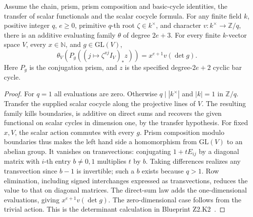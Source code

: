 
\begin{theorem}\label{pn:P033}
Assume the chain, prism, prism composition and basic-cycle identities,
the transfer of scalar functionals and the scalar cocycle formula.
For any finite field \(k\), positive integer \(q\), \(e\ge0\),
primitive \(q\)-th root \(\zeta\in k^\times\), and character
\(v:k^\times\to\mathbb Z/q\), there is an additive evaluating
family \(\theta\) of degree \(2e+3\). For every finite \(k\)-vector
space \(V\), every \(x\in\mathbb N\), and \(g\in\mathrm{GL}(V)\),
\[
 \theta_V\!\left(P_g((j\mapsto\zeta^{xj}I_V)_*z)\right)
 = x^{e+1}v(\det g).
\]
Here \(P_g\) is the conjugation prism, and \(z\) is the specified
degree-\(2e+2\) cyclic bar cycle.
\end{theorem}
\begin{proof}
For \(q=1\) all evaluations are zero. Otherwise \(q\mid |k^\times|\)
and \(|k|=1\) in \(\mathbb Z/q\). Transfer the supplied scalar
cocycle along the projective lines of \(V\). The resulting family
kills boundaries, is additive on direct sums and recovers the given
functional on scalar cycles in dimension one, by the transfer hypothesis.
For fixed \(x,V\), the scalar action commutes with every \(g\).
Prism composition modulo boundaries thus makes the left hand side
a homomorphism from \(\mathrm{GL}(V)\) to an abelian group. It
vanishes on transvections: conjugating \(1+tE_{ij}\) by a diagonal
matrix with \(i\)-th entry \(b\ne0,1\) multiplies \(t\) by \(b\).
Taking differences realizes any transvection since \(b-1\) is
invertible; such a \(b\) exists because \(q>1\). Row elimination,
including signed interchanges expressed as transvections, reduces
the value to that on diagonal matrices. The direct-sum law adds the
one-dimensional evaluations, giving \(x^{e+1}v(\det g)\). The
zero-dimensional case follows from the trivial action. This is the
determinant calculation in Blueprint Z2.K2~.
\end{proof}
